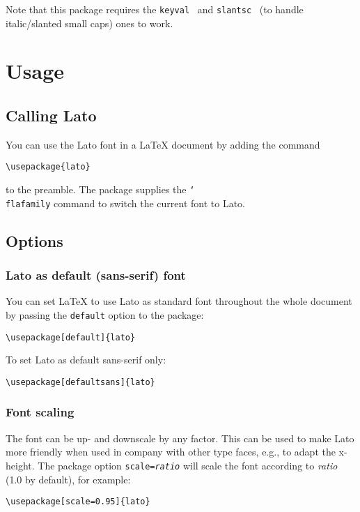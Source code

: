 \documentclass{article}
\newcommand{\code}{\texttt}
\newcommand{\package}{\texttt}
\newcommand{\parameter}[1]{\textnormal{\textit{#1}}}
\begin{document}
Note that this package requires the \package{keyval}~\cite{keyval} and
\package{slantsc}~\cite{slantsc} (to handle italic/slanted small caps) ones to
work.

\section{Usage}

\subsection{Calling Lato}

You can use the Lato font in a \LaTeX{} document by adding the command
\begin{verbatim}
\usepackage{lato}
\end{verbatim}
to the preamble. The package supplies the \code{\char`\\flafamily} command to
switch the current font to Lato.

\subsection{Options}

\subsubsection{Lato as default (sans-serif) font}

You can set \LaTeX{} to use Lato as standard font throughout the whole document
by passing the \code{default} option to the package:
\begin{verbatim}
\usepackage[default]{lato}
\end{verbatim}
To set Lato as default sans-serif only:
\begin{verbatim}
\usepackage[defaultsans]{lato}
\end{verbatim}

\subsubsection{Font scaling}

The font can be up- and downscale by any factor. This can be used to make Lato
more friendly when used in company with other type faces, e.g., to adapt the
x-height. The package option \code{scale=\parameter{ratio}} will scale the font
according to \parameter{ratio} (1.0 by default), for example:
\begin{verbatim}
\usepackage[scale=0.95]{lato}
\end{verbatim}
\end{document}
